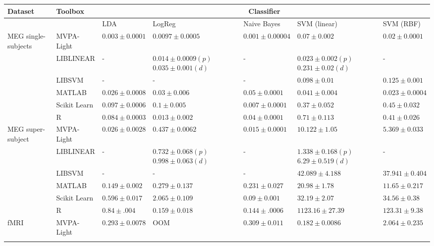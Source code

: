 \documentclass[utf8]{frontiersSCNS} %
\begin{document}
\begin{table}
\footnotesize
\begin{tabular}{ |p{1.1cm}|p{1.7cm}|p{2cm}|p{2.1cm}|p{2cm}|p{2.1cm}|p{2cm}|}
 \hline
 Dataset & Toolbox & \multicolumn{5}{c}{Classifier}\\ \hline
\multicolumn{2}{|c|}{}  & LDA & LogReg & Naive Bayes & SVM (linear) & SVM (RBF)\\
 \hline
\multirow{6}{1.3cm}{MEG single-subjects} & MVPA-Light & $\mathbf{0.003}\pm 0.0001$ & $\mathbf{0.0097}\pm0.0005$ & $\mathbf{0.001}\pm0.00004$ & $0.07\pm0.002$ & $\mathbf{0.02}\pm0.0001$\\
\cline{2-7}
  & LIBLINEAR & - & $0.014\pm0.0009(p)$ $0.035\pm0.001 (d)$ & - & $\mathbf{0.023}\pm0.002(p)$ $0.231\pm0.02(d)$ & -\\
\cline{2-7}
  & LIBSVM & - & - & - & $0.098\pm0.01$ & $0.125\pm0.001$\\
\cline{2-7}
  & MATLAB & $0.026\pm0.0008$ & $0.03\pm0.006$ & $0.05\pm0.0001$ & $0.041\pm0.004$ & $0.023\pm0.0004$\\
\cline{2-7}
   & Scikit Learn & $0.097\pm0.0006$ & $0.1\pm0.005$ & $0.007\pm0.0001$ & $0.37\pm0.052$ & $0.45\pm0.032$\\
\cline{2-7}
  & R & $0.084\pm 0.0003$ & $0.013\pm0.002$ & $0.04\pm0.0001$ & $0.71\pm0.113$ & $0.41\pm0.026$ \\\hline
 \hline
 \multirow{6}{1.3cm}{MEG super-subject} & MVPA-Light & $\mathbf{0.026}\pm0.0028$ & $0.437\pm0.0062$ & $\mathbf{0.015}\pm0.0001$ & $10.122\pm1.05$ & $\mathbf{5.369}\pm0.033$\\
\cline{2-7}
  & LIBLINEAR & - & $0.732\pm0.068(p)$ $0.998\pm0.063(d)$& - & $\mathbf{1.338}\pm0.168(p)$ $6.29\pm0.519(d)$& -\\
\cline{2-7}
  & LIBSVM & - & - & - & $42.089\pm4.188$ & $37.941\pm0.404$\\
\cline{2-7}
  & MATLAB & $0.149\pm0.002$ & $0.279\pm0.137$ & $0.231\pm0.027$ & $20.98\pm1.78$ & $11.65\pm0.217$\\
\cline{2-7}
   & Scikit Learn & $0.596\pm0.017$ & $2.065\pm0.109$ & $0.09\pm0.001$ & $32.19\pm2.07$& $34.56\pm0.38$\\
\cline{2-7}
  & R & $0.84\pm.004$ & $\mathbf{0.159}\pm0.018$ & $0.144\pm.0006$ & $1123.16\pm27.39$ & $123.31\pm9.38$\\\hline
  \hline
\multirow{6}{1.3cm}{fMRI} & MVPA-Light & $\mathbf{0.293}\pm0.0078$ & OOM & $\mathbf{0.309}\pm0.011$ & $\mathbf{0.182}\pm0.0086$ & $\mathbf{2.064}\pm0.235$\\
\cline{2-7}

\end{tabular}
\end{table}
\end{document}
